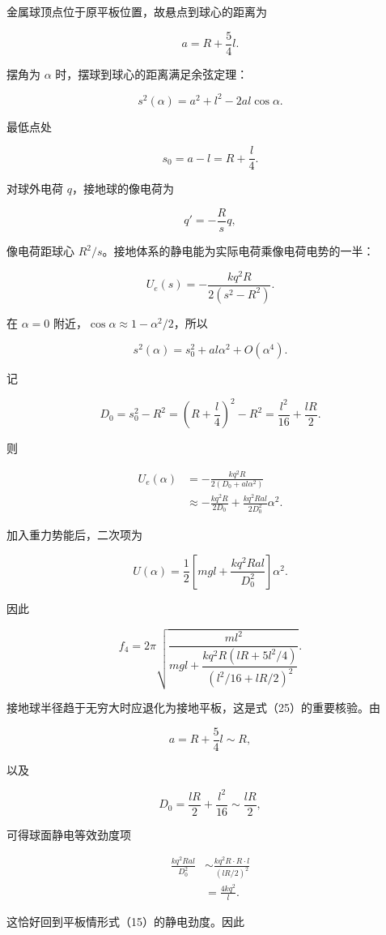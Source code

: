 \documentclass[12pt,a4paper,UTF8]{ctexart}
\begin{document}
金属球顶点位于原平板位置，故悬点到球心的距离为

\[a=R+\frac54l. \tag{17}\]

摆角为 \(\alpha\) 时，摆球到球心的距离满足余弦定理：

\[s^2(\alpha)=a^2+l^2-2al\cos\alpha. \tag{18}\]

最低点处

\[s_0=a-l=R+\frac l4. \tag{19}\]

对球外电荷 \(q\)，接地球的像电荷为

\[q'=-\frac{R}{s}q,\]

像电荷距球心 \(R^2/s\)。接地体系的静电能为实际电荷乘像电荷电势的一半：

\[U_e(s)=-\frac{kq^2R}{2(s^2-R^2)}. \tag{20}\]

在 \(\alpha=0\) 附近，\(\cos\alpha\approx1-\alpha^2/2\)，所以

\[s^2(\alpha)=s_0^2+al\alpha^2+O(\alpha^4). \tag{21}\]

记

\[D_0=s_0^2-R^2
=\left(R+\frac l4\right)^2-R^2
=\frac{l^2}{16}+\frac{lR}{2}. \tag{22}\]

则

\[\begin{aligned}
U_e(\alpha)
&=-\frac{kq^2R}{2(D_0+al\alpha^2)}\\
&\approx-\frac{kq^2R}{2D_0}
+\frac{kq^2Ral}{2D_0^2}\alpha^2.
\end{aligned} \tag{23}\]

加入重力势能后，二次项为

\[U(\alpha)=\frac12\left[mgl+
\frac{kq^2Ral}{D_0^2}\right]\alpha^2. \tag{24}\]

因此

\[\boxed{
f_4=2\pi\sqrt{
\frac{ml^2}{
mgl+\dfrac{kq^2R\left(lR+5l^2/4\right)}
{\left(l^2/16+lR/2\right)^2}}
}
}. \tag{25}\]

接地球半径趋于无穷大时应退化为接地平板，这是式（25）的重要核验。由

\[a=R+\frac54l\sim R,\]

以及

\[D_0=\frac{lR}{2}+\frac{l^2}{16}\sim\frac{lR}{2},\]

可得球面静电等效劲度项

\[\begin{aligned}
\frac{kq^2Ral}{D_0^2}
&\sim\frac{kq^2R\cdot R\cdot l}{(lR/2)^2}\\
&=\frac{4kq^2}{l}.
\end{aligned}\]

这恰好回到平板情形式（15）的静电劲度。因此
\end{document}
